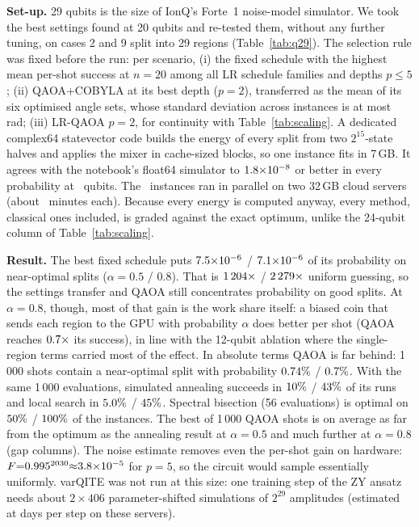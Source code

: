 \documentclass[10pt,twocolumn]{article}
\begin{document}
\textbf{Set-up.} 29 qubits is the size of IonQ's Forte~1 noise-model simulator. We took the best settings found at 20 qubits and re-tested them, without any further tuning, on cases 2 and 9 split into 29 regions (Table~\ref{tab:q29}). The selection rule was fixed before the run: per scenario, (i) the fixed schedule with the highest mean per-shot success at $n{=}20$ among all LR schedule families and depths $p\le5$; (ii) QAOA+COBYLA at its best depth ($p{=}2$), transferred as the mean of its six optimised angle sets, whose standard deviation across instances is at most \QnAngleSpread\,rad; (iii) LR-QAOA $p{=}2$, for continuity with Table~\ref{tab:scaling}. A dedicated complex64 statevector code builds the energy of every split from two $2^{15}$-state halves and applies the mixer in cache-sized blocks, so one instance fits in 7\,GB. It agrees with the notebook's float64 simulator to $1.8{\times}10^{-8}$ or better in every probability at \QnValidationSizes\ qubits. The \QnInstances\ instances ran in parallel on two 32\,GB cloud servers (about \QnInstanceMinutes\ minutes each). Because every energy is computed anyway, every method, classical ones included, is graded against the exact optimum, unlike the 24-qubit column of Table~\ref{tab:scaling}.

\textbf{Result.} The best fixed schedule puts $7.5{\times}10^{-6}$ / $7.1{\times}10^{-6}$ of its probability on near-optimal splits ($\alpha{=}0.5$ / $0.8$). That is $1\,204\times$ / $2\,279\times$ uniform guessing, so the settings transfer and QAOA still concentrates probability on good splits. At $\alpha{=}0.8$, though, most of that gain is the work share itself: a biased coin that sends each region to the GPU with probability $\alpha$ does better per shot (QAOA reaches $0.7\times$ its success), in line with the 12-qubit ablation where the single-region terms carried most of the effect. In absolute terms QAOA is far behind: 1\,000 shots contain a near-optimal split with probability $0.74\%$ / $0.7\%$. With the same 1\,000 evaluations, simulated annealing succeeds in $10\%$ / $43\%$ of its runs and local search in $5.0\%$ / $45\%$. Spectral bisection (56 evaluations) is optimal on $50\%$ / $100\%$ of the instances. The best of 1\,000 QAOA shots is on average as far from the optimum as the annealing result at $\alpha{=}0.5$ and much further at $\alpha{=}0.8$ (gap columns). The noise estimate removes even the per-shot gain on hardware: $F{=}0.995^{2030}{\approx}3.8{\times}10^{-5}$ for $p{=}5$, so the circuit would sample essentially uniformly. varQITE was not run at this size: one training step of the ZY ansatz needs about $2\times406$ parameter-shifted simulations of $2^{29}$ amplitudes (estimated at days per step on these servers).
\end{document}
